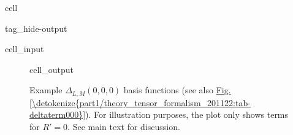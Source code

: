 \documentclass[letterpaper,table,10pt,english]{jupyterBook}
\begin{document}
\begin{sphinxuseclass}{cell}
\begin{sphinxuseclass}{tag_hide-output}
\begin{sphinxVerbatimInput}
\begin{sphinxuseclass}{cell_input}
\begin{sphinxVerbatim}[commandchars=\\\{\}]
  
   
\end{sphinxVerbatim}

\end{sphinxuseclass}\end{sphinxVerbatimInput}

\end{sphinxuseclass}
\end{sphinxuseclass}
\begin{figure}[htbp]
\centering
\capstart
\begin{sphinxVerbatimOutput}

\begin{sphinxuseclass}{cell_output}
\noindent{}

\end{sphinxuseclass}\end{sphinxVerbatimOutput}
\caption{Example \(\Delta_{L,M}(0,0,0)\) basis functions (see also \hyperref[\detokenize{part1/theory_tensor_formalism_201122:tab-deltaterm000}]{Fig.\@ \ref{\detokenize{part1/theory_tensor_formalism_201122:tab-deltaterm000}}}). For illustration purposes, the plot only shows terms for \(R'=0\). See main text for discussion.}\label{\detokenize{part1/theory_tensor_formalism_201122:fig-deltaterm000}}\end{figure}
\end{document}
